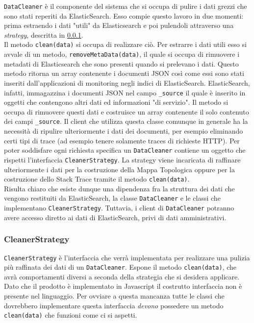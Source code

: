 \label{sec:DataCleaner}
\texttt{DataCleaner} è il componente del sistema che si occupa di pulire i dati grezzi che sono stati reperiti da ElasticSearch. Esso compie questo lavoro in due momenti: prima estraendo i dati "utili" da Elasticsearch e poi pulendoli attraverso una \emph{strategy}, descritta in \ref{sec:CleanerStrategy}.\\
Il metodo \texttt{clean(data)} si occupa di realizzare ciò.
Per estrarre i dati utili esso si avvale di un metodo, \texttt{removeMetaData(data)}, il quale si occupa di rimuovere i metadati di Elasticsearch che sono presenti quando si prelevano i dati. Questo metodo ritorna un array contenente i documenti JSON così come essi sono stati inseriti dall'applicazioni di monitoring negli indici di ElasticSearch. ElasticSearch, infatti, immagazzina i documenti JSON nel campo \texttt{\_source} il quale è inserito in oggetti che contengono altri dati ed informazioni "di servizio". Il metodo si occupa di rimuovere questi dati e costruisce un array contenente il solo contenuto dei campi \texttt{\_source}. Il client che utilizza questa classe comunque in generale ha la necessità di ripulire ulteriormente i dati dei documenti, per esempio eliminando certi tipi di trace (ad esempio tenere solamente traces di richieste HTTP). Per poter soddisfare ogni richiesta specifica un \texttt{DataCleaner} contiene un oggetto che rispetti l'interfaccia \texttt{CleanerStrategy}. La strategy viene incaricata di raffinare ulteriormente i dati per la costruzione della Mappa Topologica oppure per la costruzione dello Stack Trace tramite il metodo \texttt{clean(data)}. \\
Risulta chiaro che esiste dunque una dipendenza fra la struttura dei dati che vengono restituiti da ElasticSearch, la classe \texttt{DataCleaner} e le classi che implementano \texttt{CleanerStrategy}. Tuttavia, i client di \texttt{DataCleaner} potranno avere accesso diretto ai dati di ElasticSearch, privi di dati amministrativi.

	
\subsubsection{CleanerStrategy}
\label{sec:CleanerStrategy}

\texttt{CleanerStrategy} è l'interfaccia che verrà implementata per realizzare una pulizia più raffinata dei dati di un \texttt{DataCleaner}. Espone il metodo \texttt{clean(data)}, che avrà comportamenti diversi a seconda della strategia che si desidera applicare. Dato che il prodotto è implementato in Javascript il costrutto interfaccia non è presente nel linguaggio. Per ovviare a questa mancanza tutte le classi che dovrebbero implementare questa interfaccia \emph{devono} possedere un metodo \texttt{clean(data)} che funzioni come ci si aspetti. 

